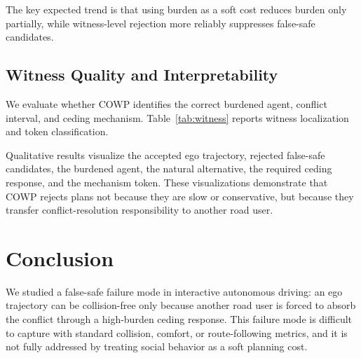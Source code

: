 \documentclass[10pt]{article}
\begin{document}
The key expected trend is that using burden as a soft cost reduces burden only partially, while witness-level rejection more reliably suppresses false-safe candidates.

\subsection{Witness Quality and Interpretability}
\label{sec:witness_quality}

We evaluate whether COWP identifies the correct burdened agent, conflict interval, and ceding mechanism. Table~\ref{tab:witness} reports witness localization and token classification.

\begin{table}[t]
\centering
\caption{Coercion witness quality.}
\label{tab:witness}
\end{table}

Qualitative results visualize the accepted ego trajectory, rejected false-safe candidates, the burdened agent, the natural alternative, the required ceding response, and the mechanism token. These visualizations demonstrate that COWP rejects plans not because they are slow or conservative, but because they transfer conflict-resolution responsibility to another road user.

\section{Conclusion}
\label{sec:conclusion}

We studied a false-safe failure mode in interactive autonomous driving: an ego trajectory can be collision-free only because another road user is forced to absorb the conflict through a high-burden ceding response. This failure mode is difficult to capture with standard collision, comfort, or route-following metrics, and it is not fully addressed by treating social behavior as a soft planning cost.
\end{document}
